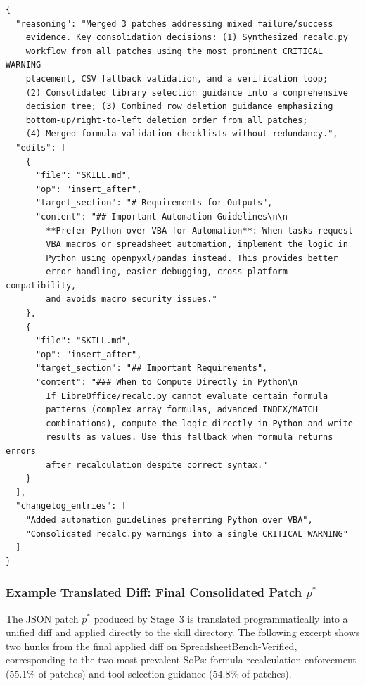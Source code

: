 \begin{tcolorbox}[
    title={\textbf{Example Stage 3 Final Patch Output (excerpt)}},
    colback=purple!3, colframe=purple!30, fonttitle=\small\bfseries,
    breakable, left=4pt, right=4pt, top=4pt, bottom=4pt
]
\small
\begin{lstlisting}[style=appendixprompt]
{
  "reasoning": "Merged 3 patches addressing mixed failure/success
    evidence. Key consolidation decisions: (1) Synthesized recalc.py
    workflow from all patches using the most prominent CRITICAL WARNING
    placement, CSV fallback validation, and a verification loop;
    (2) Consolidated library selection guidance into a comprehensive
    decision tree; (3) Combined row deletion guidance emphasizing
    bottom-up/right-to-left deletion order from all patches;
    (4) Merged formula validation checklists without redundancy.",
  "edits": [
    {
      "file": "SKILL.md",
      "op": "insert_after",
      "target_section": "# Requirements for Outputs",
      "content": "## Important Automation Guidelines\n\n
        **Prefer Python over VBA for Automation**: When tasks request
        VBA macros or spreadsheet automation, implement the logic in
        Python using openpyxl/pandas instead. This provides better
        error handling, easier debugging, cross-platform compatibility,
        and avoids macro security issues."
    },
    {
      "file": "SKILL.md",
      "op": "insert_after",
      "target_section": "## Important Requirements",
      "content": "### When to Compute Directly in Python\n
        If LibreOffice/recalc.py cannot evaluate certain formula
        patterns (complex array formulas, advanced INDEX/MATCH
        combinations), compute the logic directly in Python and write
        results as values. Use this fallback when formula returns errors
        after recalculation despite correct syntax."
    }
  ],
  "changelog_entries": [
    "Added automation guidelines preferring Python over VBA",
    "Consolidated recalc.py warnings into a single CRITICAL WARNING"
  ]
}
\end{lstlisting}
\end{tcolorbox}

\subsubsection{Example Translated Diff: Final Consolidated Patch $p^*$}
\label{app:example_patch}

The JSON patch $p^*$ produced by Stage~3 is translated programmatically into a unified diff and applied directly to the skill directory.
The following excerpt shows two hunks from the final applied diff on SpreadsheetBench-Verified, corresponding to the two most prevalent SoPs: formula recalculation enforcement (55.1\% of patches) and tool-selection guidance (54.8\% of patches).


